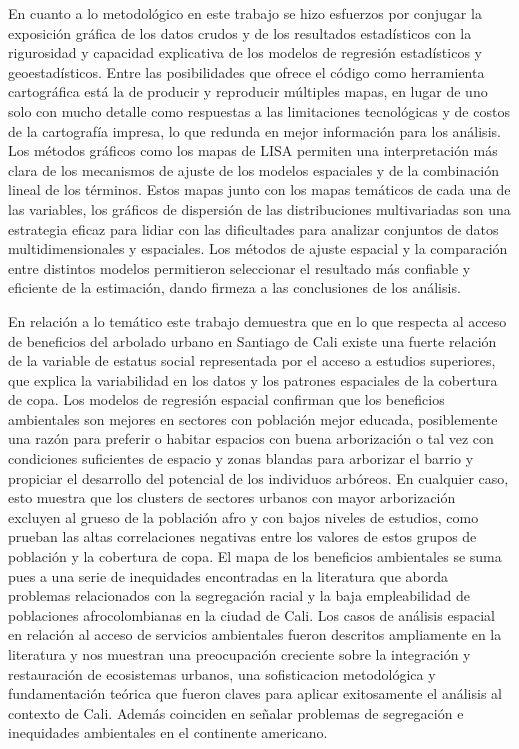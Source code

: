 \documentclass[12pt,]{book}
\begin{document}
En cuanto a lo metodológico en este trabajo se hizo esfuerzos por
conjugar la exposición gráfica de los datos crudos y de los resultados
estadísticos con la rigurosidad y capacidad explicativa de los modelos
de regresión estadísticos y geoestadísticos. Entre las posibilidades que
ofrece el código como herramienta cartográfica está la de producir y
reproducir múltiples mapas, en lugar de uno solo con mucho detalle como
respuestas a las limitaciones tecnológicas y de costos de la cartografía
impresa, lo que redunda en mejor información para los análisis. Los
métodos gráficos como los mapas de LISA permiten una interpretación más
clara de los mecanismos de ajuste de los modelos espaciales y de la
combinación lineal de los términos. Estos mapas junto con los mapas
temáticos de cada una de las variables, los gráficos de dispersión de
las distribuciones multivariadas son una estrategia eficaz para lidiar
con las dificultades para analizar conjuntos de datos multidimensionales
y espaciales. Los métodos de ajuste espacial y la comparación entre
distintos modelos permitieron seleccionar el resultado más confiable y
eficiente de la estimación, dando firmeza a las conclusiones de los
análisis.

En relación a lo temático este trabajo demuestra que en lo que respecta
al acceso de beneficios del arbolado urbano en Santiago de Cali existe
una fuerte relación de la variable de estatus social representada por el
acceso a estudios superiores, que explica la variabilidad en los datos y
los patrones espaciales de la cobertura de copa. Los modelos de
regresión espacial confirman que los beneficios ambientales son mejores
en sectores con población mejor educada, posiblemente una razón para
preferir o habitar espacios con buena arborización o tal vez con
condiciones suficientes de espacio y zonas blandas para arborizar el
barrio y propiciar el desarrollo del potencial de los individuos
arbóreos. En cualquier caso, esto muestra que los clusters de sectores
urbanos con mayor arborización excluyen al grueso de la población afro y
con bajos niveles de estudios, como prueban las altas correlaciones
negativas entre los valores de estos grupos de población y la cobertura
de copa. El mapa de los beneficios ambientales se suma pues a una serie
de inequidades encontradas en la literatura que aborda problemas
relacionados con la segregación racial y la baja empleabilidad de
poblaciones afrocolombianas en la ciudad de Cali. Los casos de análisis
espacial en relación al acceso de servicios ambientales fueron descritos
ampliamente en la literatura y nos muestran una preocupación creciente
sobre la integración y restauración de ecosistemas urbanos, una
sofisticacion metodológica y fundamentación teórica que fueron claves
para aplicar exitosamente el análisis al contexto de Cali. Además
coinciden en señalar problemas de segregación e inequidades ambientales
en el continente americano.
\end{document}
